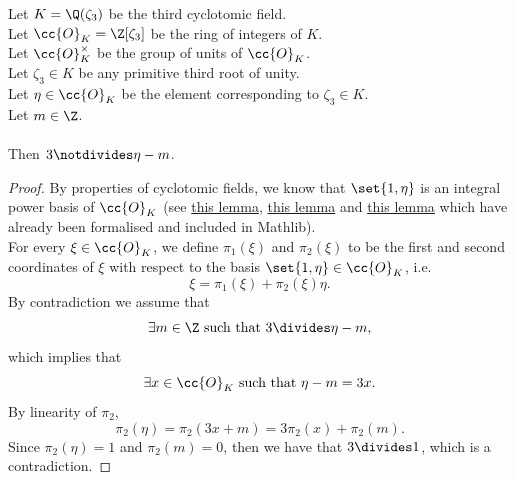 \begin{theorem}
    \label{thm:not_exists_int_three_dvd_sub}
    \leanok
    Let $K = \Q(\zeta_3)$ be the third cyclotomic field. \\
    Let $\cc{O}_K = \Z[\zeta_3]$ be the ring of integers of $K$. \\
    Let $\cc{O}^\times_K$ be the group of units of $\cc{O}_K$. \\
    Let $\zeta_3 \in K$ be any primitive third root of unity. \\
    Let $\eta \in \cc{O}_K$ be the element corresponding to $\zeta_3 \in K$. \\
    Let $m \in \Z$. \\\\
    Then $3 \notdivides \eta - m$.
\end{theorem}
\begin{proof}
    \leanok
    By properties of cyclotomic fields, we know that $\set{1,\eta}$ is an integral power basis of $\cc{O}_K$
    (see \href{https://pitmonticone.github.io/FLT3/docs/FLT3/Mathlib/NumberTheory/Cyclotomic/Rat.html#IsPrimitiveRoot.integralPowerBasis'}{this lemma},
    \href{https://pitmonticone.github.io/FLT3/docs/FLT3/Mathlib/NumberTheory/Cyclotomic/Rat.html#IsPrimitiveRoot.power_basis_int'_dim}{this lemma}
    and \href{https://pitmonticone.github.io/FLT3/docs/FLT3/Mathlib/NumberTheory/Cyclotomic/Rat.html#IsPrimitiveRoot.integralPowerBasis'_gen}{this lemma}
    which have already been formalised and included in Mathlib).\\
    For every $\xi \in \cc{O}_K$, we define $\pi_1(\xi)$ and $\pi_2(\xi)$ to be the first and second
    coordinates of $\xi$ with respect to the basis $\set{1,\eta} \in \cc{O}_K$, i.e.
    $$\xi = \pi_1(\xi) + \pi_2(\xi)\eta.$$
    By contradiction we assume that
    $$\exists m \in \Z \text{ such that } 3 \divides \eta - m,$$
    which implies that
    $$\exists x \in \cc{O}_K \text{ such that } \eta - m = 3 x.$$
    By linearity of $\pi_2$,
    $$\pi_2(\eta) = \pi_2(3x + m) = 3\pi_2(x) + \pi_2(m).$$
    Since $\pi_2(\eta) = 1$ and $\pi_2(m) = 0$, then we have that $3 \divides 1$, which is a contradiction.
\end{proof}

